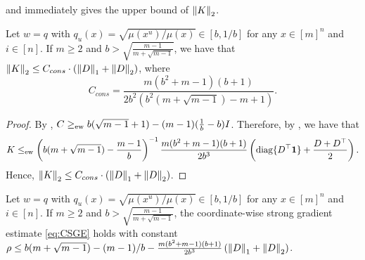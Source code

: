  and  immediately gives the upper bound of $\norm{K}_2$.
\begin{lemma}\label{lem:hyper_grid_Dobrushin_to_CSGE_K}
    Let $w = q$ with $q_u(x) = \sqrt{\mu(x^u)/\mu(x)} \in [b,1/b]$ for any $x\in [m]^n$ and $i\in [n]$. 
    If $m\geq 2$ and $b>\sqrt{\frac{m-1}{m+\sqrt{m-1}}}$, we have that $\norm{K}_2 \leq C_{cons}\cdot (\norm{D}_1 + \norm{D}_2)$, where
    \begin{equation}\label{eq:hyper_grid_CSGE_C_cons}
        C_{cons} = \frac{m(b^2+m-1)(b+1)}{2b^2(b^2(m+\sqrt{m-1})-m+1)} .
    \end{equation}
\end{lemma}
\begin{proof}
    By , $C \geq_{\-{ew}} b(\sqrt{m-1}+1)-(m-1)(\frac 1b-b) I$.
    Therefore, by , 
    we have that
    $$
        K \leq_{\-{ew}} \tp{b(m+\sqrt{m-1}) - \frac{m-1}{b}}^{-1}\frac{m(b^2+m-1)(b+1)}{2b^3}\tp{\diag\{D^\top \*1\} + \frac{D+D^\top}{2}}.
    $$
    Hence, $\norm{K}_2 \leq C_{cons}\cdot(\norm{D}_1 + \norm{D}_2)$.
\end{proof}
\begin{corollary}
    Let $w = q$ with $q_u(x) = \sqrt{\mu(x^u)/\mu(x)} \in [b,1/b]$ for any $x\in [m]^n$ and $i\in [n]$. 
    If $m\geq 2$ and $b>\sqrt{\frac{m-1}{m+\sqrt{m-1}}}$, the coordinate-wise strong gradient estimate \eqref{eq:CSGE} holds with constant $\rho \leq b(m+\sqrt{m-1})-(m-1)/b-\frac{m(b^2+m-1)(b+1)}{2b^3}\tp{\norm{D}_1+\norm{D}_2}$.
\end{corollary}

